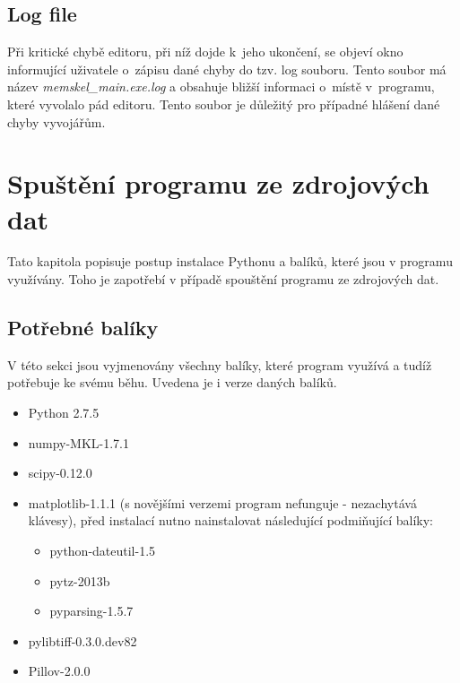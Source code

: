 \subsection{Log file}
Při kritické chybě editoru, při níž dojde k~jeho ukončení, se objeví okno informující uživatele o~zápisu dané chyby do tzv. log souboru. Tento soubor má název \textit{memskel\_main.exe.log} a obsahuje bližší informaci o~místě v~programu, které vyvolalo pád editoru. Tento soubor je důležitý pro případné hlášení dané chyby vyvojářům.

\section{Spuštění programu ze zdrojových dat}
Tato kapitola popisuje postup instalace Pythonu a balíků, které jsou v programu využívány. Toho je zapotřebí v případě spouštění programu ze zdrojových dat.
\subsection{Potřebné balíky}
V této sekci jsou vyjmenovány všechny balíky, které program využívá a tudíž potřebuje ke svému běhu. Uvedena je i verze daných balíků.
\begin{itemize}
	\item Python 2.7.5
	\item numpy-MKL-1.7.1
	\item scipy-0.12.0
	\item matplotlib-1.1.1 (s novějšími verzemi program nefunguje - nezachytává klávesy), před instalací nutno nainstalovat následující podmiňující balíky:
		\begin{itemize}
			\item python-dateutil-1.5
			\item pytz-2013b
			\item pyparsing-1.5.7
		\end{itemize}
	\item pylibtiff-0.3.0.dev82
	\item Pillov-2.0.0
\end{itemize}

